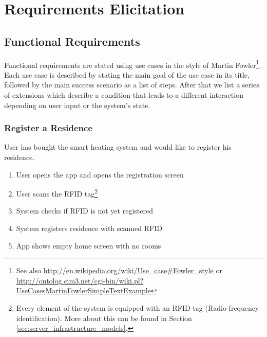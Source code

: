 
\chapter{Requirements Elicitation}
\label{sec:requirements}

\section{Functional Requirements}

Functional requirements are stated using use cases in the style of Martin Fowler\footnote{See also \url{http://en.wikipedia.org/wiki/Use_case\#Fowler_style} or \url{http://ontolog.cim3.net/cgi-bin/wiki.pl?UseCasesMartinFowlerSimpleTextExample}}. Each use case is described by stating the main goal of the use case in its title, followed by the main success scenario as a list of steps. After that we list a series of extensions which describe a condition that leads to a different interaction depending on user input or the system's state.


\subsection*{Register a Residence}
User has bought the smart heating system and would like to register his residence.
\begin{enumerate}
    \item User opens the app and opens the registration screen
    \item User scans the RFID tag\footnote{Every element of the system is equipped with an RFID tag (Radio-frequency identification). More about this can be found in Section \ref{sec:server_infrastructure_models}.}
    \item System checks if RFID is not yet registered
    \item System registers residence with scanned RFID
    \item App shows empty home screen with no rooms
\end{enumerate}

